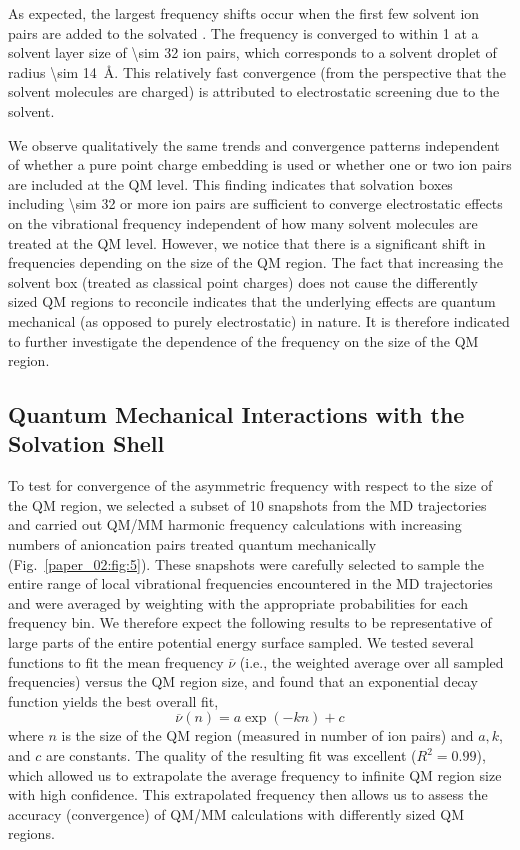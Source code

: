 As expected, the largest frequency shifts occur when the first few solvent ion pairs are added to the solvated . The frequency is converged to within \SI{1}{\wavenumber} at a solvent layer size of \num{\sim 32} ion pairs, which corresponds to a solvent droplet of radius \SI{\sim 14}{\angstrom}. This relatively fast convergence (from the perspective that the solvent molecules are charged) is attributed to electrostatic screening due to the solvent.

We observe qualitatively the same trends and convergence patterns independent of whether a pure point charge embedding is used or whether one or two ion pairs are included at the QM level. This finding indicates that solvation boxes including \num{\sim 32} or more ion pairs are sufficient to converge electrostatic effects on the vibrational frequency independent of how many solvent molecules are treated at the QM level. However, we notice that there is a significant shift in frequencies depending on the size of the QM region. The fact that increasing the solvent box (treated as classical point charges) does not cause the differently sized QM regions to reconcile indicates that the underlying effects are quantum mechanical (as opposed to purely electrostatic) in nature. It is therefore indicated to further investigate the dependence of the frequency on the size of the QM region.

\subsection{Quantum Mechanical Interactions with the Solvation Shell}
\label{paper_02:ssec:IIIE}

To test for convergence of the asymmetric frequency with respect to the size of the QM region, we selected a subset of \num{10} snapshots from the MD trajectories and carried out QM/MM harmonic frequency calculations with increasing numbers of anion\textendash{}cation pairs treated quantum mechanically (Fig.~\ref{paper_02:fig:5}). These snapshots were carefully selected to sample the entire range of local vibrational frequencies encountered in the MD trajectories and were averaged by weighting with the appropriate probabilities for each frequency bin. We therefore expect the following results to be representative of large parts of the entire potential energy surface sampled. We tested several functions to fit the mean frequency \(\overline{\nu}\) (i.e., the weighted average over all sampled frequencies) versus the QM region size, and found that an exponential decay function yields the best overall fit,
\begin{equation*}
  \overline{\nu}\left( n \right) = a\exp{\left( -kn \right)} + c
\end{equation*}
where \(n\) is the size of the QM region (measured in number of ion pairs) and \(a, k\), and \(c\) are constants. The quality of the resulting fit was excellent (\(R^2 = 0.99\)), which allowed us to extrapolate the average frequency to infinite QM region size with high confidence. This extrapolated frequency then allows us to assess the accuracy (convergence) of QM/MM calculations with differently sized QM regions.

